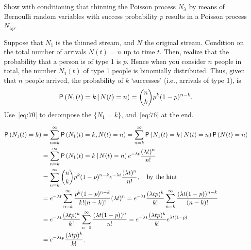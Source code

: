 \begin{extra}
  Show with conditioning that thinning the Poisson process $N_\lambda$ by means of Bernoulli random variables with success probability $p$ results in a Poisson process $N_{\lambda p}$.
\begin{hint}
Suppose that  $N_1$ is the  thinned stream, and $N$ the original stream.  Condition on the total number of arrivals $N(t)=n$ up to time
      $t$. Then, realize that the probability that a person is of type 1 is $p$. Hence when you consider $n$ people in
      total, the number $N_1(t)$ of type 1 people is binomially distributed. Thus, given that $n$ people arrived, the probability of $k$ `successes' (i.e., arrivals of type 1), is 
      \begin{equation*}
        \P{N_1(t)=k \given N(t) = n} = {n \choose k} p^k (1-p)^{n-k}.
      \end{equation*}
Use~\cref{eq:70} to decompose the $\{N_1=k\}$, and~\cref{eq:76} at the end. 
\end{hint}
\begin{solution}
\begin{align*}
    \P{N_1(t) = k}
&= \sum_{n=k}^\infty \P{N_1(t) =k, N(t) = n} 
= \sum_{n=k}^\infty \P{N_1(t) =k\given N(t) = n}\P{N(t)=n} \\
&= \sum_{n=k}^\infty \P{N_1(t) =k\given N(t) = n}e^{-\lambda t} \frac{(\lambda t)^n}{n!}\\
&= \sum_{n=k}^\infty {n \choose k} p^k (1-p)^{n-k} e^{-\lambda t} \frac{(\lambda t)^n}{n!}, \quad\text{by the hint}\\
&= e^{-\lambda t}\sum_{n=k}^\infty  \frac{p^k (1-p)^{n-k}}{k! (n-k)!} (\lambda t)^n
= e^{-\lambda t} \frac{(\lambda t p)^k}{k!} \sum_{n=k}^\infty  \frac{(\lambda t (1-p))^{n-k}}{(n-k)!}\\
&= e^{-\lambda t} \frac{(\lambda  t p)^k}{k!} \sum_{n=0}^\infty  \frac{(\lambda t (1-p))^{n}}{n!}
= e^{-\lambda t} \frac{(\lambda t p)^k}{k!} e^{\lambda t(1-p)} \\
&= e^{-\lambda t p} \frac{(\lambda t p)^k}{k!}.
\end{align*}
\end{solution}
\end{extra}    


